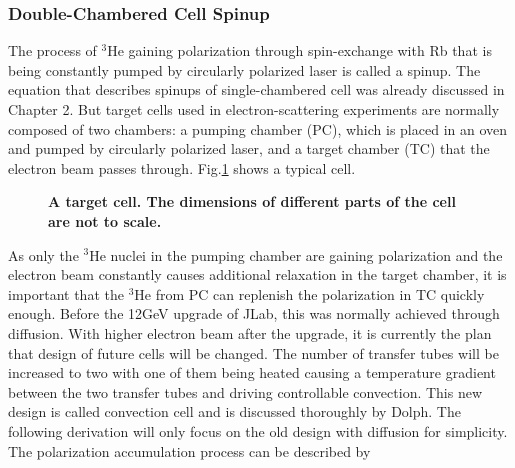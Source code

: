 \subsubsection{Double-Chambered Cell Spinup}

The process of $^{3}$He gaining polarization through spin-exchange with Rb that is being constantly pumped by circularly polarized laser is called a spinup. The equation that describes spinups of single-chambered cell was already discussed in Chapter 2. But target cells used in electron-scattering experiments are normally composed of two chambers: a pumping chamber (PC), which is placed in an oven and pumped by circularly polarized laser, and a target chamber (TC) that the electron beam passes through. Fig.\ref{TargetCell} shows a typical cell.

\begin{figure}[H]
	\centering
	\caption{{\bf A target cell. The dimensions of different parts of the cell are not to scale.}}
	\label{TargetCell}
\end{figure}

As only the $^{3}$He nuclei in the pumping chamber are gaining polarization and the electron beam constantly causes additional relaxation in the target chamber, it is important that the $^{3}$He from PC can replenish the polarization in TC quickly enough. Before the 12GeV upgrade of JLab, this was normally achieved through diffusion. With higher electron beam after the upgrade, it is currently the plan that design of future cells will be changed. The number of transfer tubes will be increased to two with one of them being heated causing a temperature gradient between the two transfer tubes and driving controllable convection. This new design is called convection cell and is discussed thoroughly by Dolph. The following derivation will only focus on the old design with diffusion for simplicity. The polarization accumulation process can be described by 

